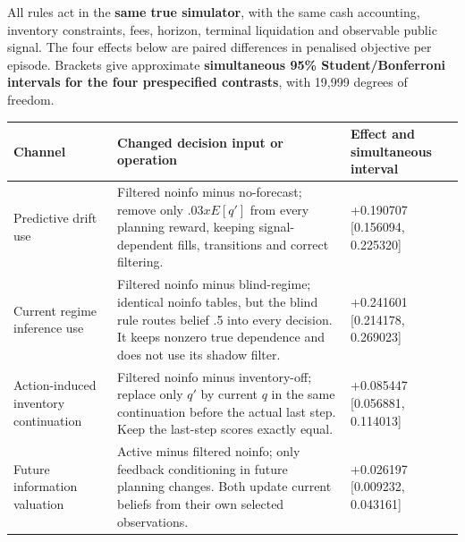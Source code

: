 \documentclass[
  10pt,
  a4paper,
]{article}
\newcounter{none} %
\begin{document}
All rules act in the \textbf{same true simulator}, with the same cash
accounting, inventory constraints, fees, horizon, terminal liquidation
and observable public signal. The four effects below are paired
differences in penalised objective per episode. Brackets give
approximate \textbf{simultaneous 95\% Student/Bonferroni intervals for
the four prespecified contrasts}, with 19,999 degrees of freedom.

{\def\LTcaptype{none} %
\begin{longtable}[]{@{}
  >{\raggedright\arraybackslash}p{}
  >{\raggedright\arraybackslash}p{}
  >{\raggedleft\arraybackslash}p{}@{}}
\toprule\noalign{}
\begin{minipage}[b]{\linewidth}\raggedright
Channel
\end{minipage} & \begin{minipage}[b]{\linewidth}\raggedright
Changed decision input or operation
\end{minipage} & \begin{minipage}[b]{\linewidth}\raggedleft
Effect and simultaneous interval
\end{minipage} \\
\midrule\noalign{}
\endhead
\bottomrule\noalign{}
\endlastfoot
Predictive drift use & Filtered noinfo minus no-forecast; remove only
\(.03xE[q']\) from every planning reward, keeping signal-dependent
fills, transitions and correct filtering. & +0.190707 {[}0.156094,
0.225320{]} \\
Current regime inference use & Filtered noinfo minus blind-regime;
identical noinfo tables, but the blind rule routes belief .5 into every
decision. It keeps nonzero true dependence and does not use its shadow
filter. & +0.241601 {[}0.214178, 0.269023{]} \\
Action-induced inventory continuation & Filtered noinfo minus
inventory-off; replace only \(q'\) by current \(q\) in the same
continuation before the actual last step. Keep the last-step scores
exactly equal. & +0.085447 {[}0.056881, 0.114013{]} \\
Future information valuation & Active minus filtered noinfo; only
feedback conditioning in future planning changes. Both update current
beliefs from their own selected observations. & +0.026197 {[}0.009232,
0.043161{]} \\
\end{longtable}
}
\end{document}
